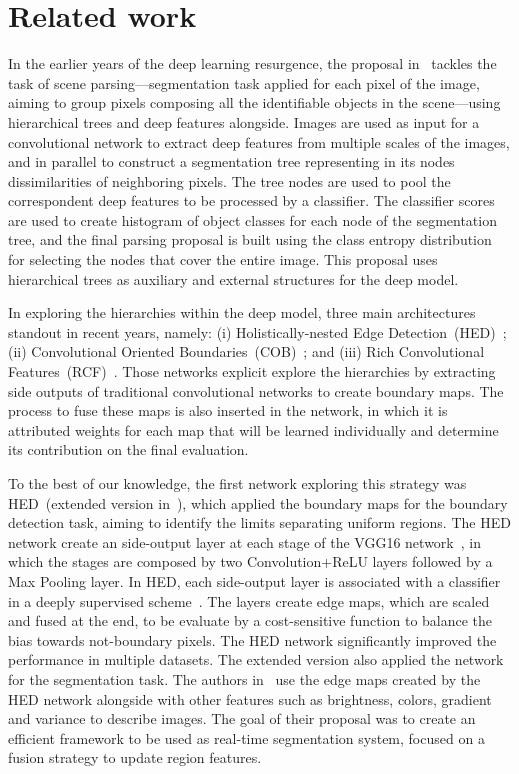 \section{Related work}
\label{sec:related}


In the earlier years of the deep learning resurgence, the proposal in~\cite{farabet2013} tackles the task of scene parsing---segmentation task applied for each pixel of the image, aiming to group pixels composing all the identifiable objects in the scene---using hierarchical trees and deep features alongside. Images are used as input for a convolutional network to extract deep features from multiple scales of the images, and in parallel to construct a segmentation tree representing in its nodes dissimilarities of neighboring pixels. The tree nodes are used to pool the correspondent deep features to be processed by a classifier. The classifier scores are used to create histogram of object classes for each node of the segmentation tree, and the final parsing proposal is built using the class entropy distribution for selecting the nodes that cover the entire image.   This proposal uses hierarchical trees as auxiliary and external structures for the deep model. 

In exploring the hierarchies within the deep model, three main architectures standout in recent years, namely: (i) Holistically-nested Edge Detection~(HED)~\cite{xie2015}; (ii) Convolutional Oriented Boundaries~(COB)~\cite{maninis2017}; and (iii) Rich Convolutional Features~(RCF)~\cite{liu2017}. Those networks explicit explore the hierarchies by extracting side outputs of traditional convolutional networks to create boundary maps. The process to fuse these maps is also inserted in the network, in which it is attributed weights for each map that will be learned individually and determine its contribution on the final evaluation. 

To the best of our knowledge, the first network exploring this strategy was HED~(extended version in~\cite{xie2017}), which applied the boundary maps for the boundary detection task, aiming to identify the limits separating uniform regions. The HED network create an side-output layer at each stage of the VGG16 network~\cite{simonyan2014}, in which the stages are composed by two Convolution+ReLU layers followed by a Max Pooling layer. In HED, each side-output layer is associated with a classifier in a deeply supervised scheme~\cite{lee2015}. The layers create edge maps, which are scaled and fused at the end, to be evaluate by a cost-sensitive function to balance the bias towards not-boundary pixels. The HED network significantly improved the performance in multiple datasets. The extended version also applied the network for the segmentation task. The authors in~\cite{cheng2016} use the edge maps created by the HED network alongside with other features such as brightness, colors, gradient and variance to describe images. The goal of their proposal was to create an efficient framework to be used as real-time segmentation system, focused on a fusion strategy to update region features.


